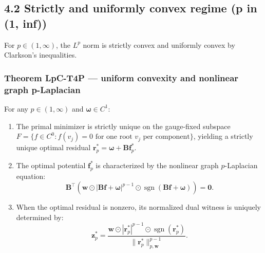 \documentclass[
]{article}
\providecommand{\tightlist}{%
  \setlength{\itemsep}{0pt}\setlength{\parskip}{0pt}}
\providecommand{\tightlist}{%
  \setlength{\itemsep}{0pt}\setlength{\parskip}{0pt}}
\begin{document}
\subsection{4.2 Strictly and uniformly convex regime (p in (1, inf))}\label{strictly-and-uniformly-convex-regime-p-in-1-inf}

For \(p \in (1, \infty)\), the \(L^p\) norm is strictly convex and uniformly convex by Clarkson's inequalities.

\subsubsection{Theorem LpC-T4P --- uniform convexity and nonlinear graph p-Laplacian}\label{theorem-lpc-t4p-uniform-convexity-and-nonlinear-graph-p-laplacian}

For any \(p \in (1, \infty)\) and \(\boldsymbol{\omega} \in C^1\):

\begin{enumerate}
\def\labelenumi{\arabic{enumi}.}
\tightlist
\item
  The primal minimizer is strictly unique on the gauge-fixed subspace \(F = \{f \in C^0 : f(v_j) = 0\text{ for one root }v_j\text{ per component}\}\), yielding a strictly unique optimal residual \(\mathbf{r}_p^* = \boldsymbol{\omega} + \mathbf{B}\mathbf{f}_p^*\).
\item
  The optimal potential \(\mathbf{f}_p^*\) is characterized by the nonlinear graph \(p\)-Laplacian equation:
  \[\mathbf{B}^\top \left( \mathbf{w} \odot |\mathbf{B}\mathbf{f} + \boldsymbol{\omega}|^{p-1} \odot \operatorname{sgn}(\mathbf{B}\mathbf{f} + \boldsymbol{\omega}) \right) = \mathbf{0}.\]
\item
  When the optimal residual is nonzero, its normalized dual witness is uniquely determined by:
  \[\mathbf{z}_p^* = \frac{\mathbf{w} \odot |\mathbf{r}_p^*|^{p-1} \odot \operatorname{sgn}(\mathbf{r}_p^*)}{\|\mathbf{r}_p^*\|_{p, \mathbf{w}}^{p-1}}.\]
\end{enumerate}
\end{document}
